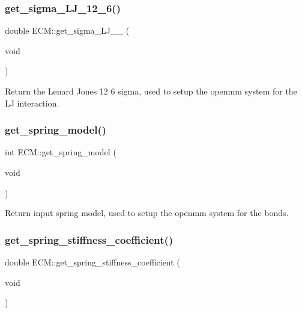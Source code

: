 \mbox{\label{classECM_a9116e5b74b658291d070c03f0a74715c}} 
\subsubsection{\texorpdfstring{get\_sigma\_LJ\_12\_6()}{get\_sigma\_LJ\_12\_6()}}
{\footnotesize\ttfamily double E\+C\+M\+::get\+\_\+sigma\+\_\+\+L\+J\+\_\+\_ (\begin{DoxyParamCaption}\item[{void}]{ }\end{DoxyParamCaption})\hspace{0.3cm}{\ttfamily [inline]}}

Return the Lenard Jones 12 6 sigma, used to setup the openmm system for the LJ interaction. \mbox{\label{classECM_ab45a4d7d1d71a4bd6ca1403f9d794203}} 
\subsubsection{\texorpdfstring{get\_spring\_model()}{get\_spring\_model()}}
{\footnotesize\ttfamily int E\+C\+M\+::get\+\_\+spring\+\_\+model (\begin{DoxyParamCaption}\item[{void}]{ }\end{DoxyParamCaption})\hspace{0.3cm}{\ttfamily [inline]}}

Return input spring model, used to setup the openmm system for the bonds. \mbox{\label{classECM_ad3602738d7ce353dea8dc7c957080815}} 
\subsubsection{\texorpdfstring{get\_spring\_stiffness\_coefficient()}{get\_spring\_stiffness\_coefficient()}}
{\footnotesize\ttfamily double E\+C\+M\+::get\+\_\+spring\+\_\+stiffness\+\_\+coefficient (\begin{DoxyParamCaption}\item[{void}]{ }\end{DoxyParamCaption})\hspace{0.3cm}{\ttfamily [inline]}}


